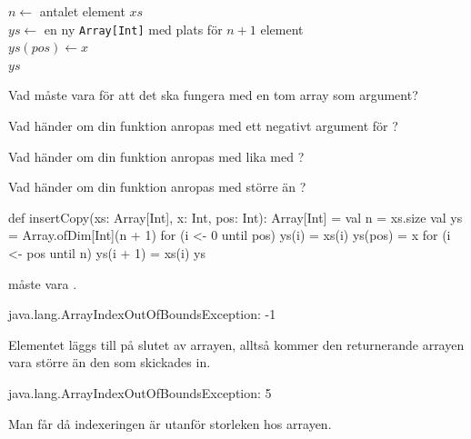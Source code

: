 \begin{algorithm}[H]

 $n \leftarrow$ antalet element $xs$\\
 $ys \leftarrow$ en ny \texttt{Array[Int]} med plats för $n+1$ element \\
 $ys(pos) \leftarrow x$ \\
 \Return $ys$
\end{algorithm}


\Subtask Vad måste  vara för att det ska fungera med en tom array som argument?

\Subtask Vad händer om din funktion anropas med ett negativt argument för ?

\Subtask Vad händer om din funktion anropas med  lika med ?

\Subtask Vad händer om din funktion anropas med  större än ?

\SOLUTION

\TaskSolved \what

\SubtaskSolved  \begin{Code}
def insertCopy(xs: Array[Int], x: Int, pos: Int): Array[Int] = {
  val n = xs.size
  val ys = Array.ofDim[Int](n + 1)
  for (i <- 0 until pos) ys(i) = xs(i)
  ys(pos) = x
  for (i <- pos until n) ys(i + 1) = xs(i)
  ys
}
\end{Code}

\SubtaskSolved  {} måste vara .

\SubtaskSolved  \begin{REPL}
java.lang.ArrayIndexOutOfBoundsException: -1
\end{REPL}

\SubtaskSolved  Elementet  läggs till på slutet av arrayen, alltså kommer den returnerande arrayen vara större än den som skickades in.

\SubtaskSolved  \begin{REPL}
java.lang.ArrayIndexOutOfBoundsException: 5
\end{REPL}
Man får  då indexeringen är utanför storleken hos arrayen.

